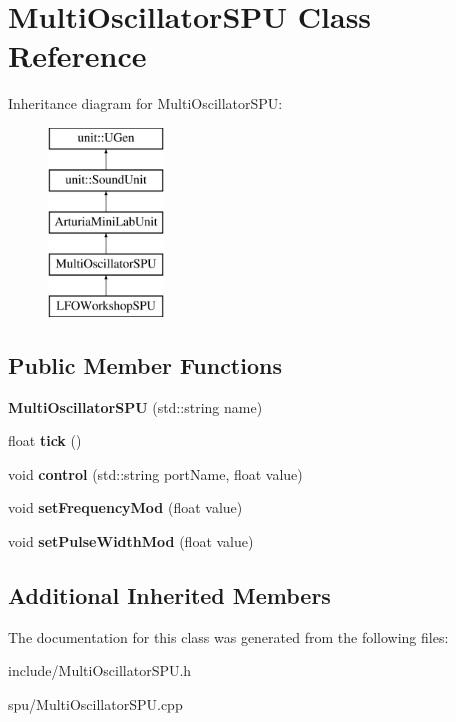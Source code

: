 \hypertarget{classMultiOscillatorSPU}{}\section{Multi\+Oscillator\+S\+PU Class Reference}
\label{classMultiOscillatorSPU}
Inheritance diagram for Multi\+Oscillator\+S\+PU\+:\begin{figure}[H]
\begin{center}
\leavevmode
\includegraphics[height=5.000000cm]{classMultiOscillatorSPU}
\end{center}
\end{figure}
\subsection*{Public Member Functions}
\begin{DoxyCompactItemize}
\item 
{\bfseries Multi\+Oscillator\+S\+PU} (std\+::string name)\hypertarget{classMultiOscillatorSPU_a3c7fc8e1067fb1b025551702344597a6}{}\label{classMultiOscillatorSPU_a3c7fc8e1067fb1b025551702344597a6}

\item 
float {\bfseries tick} ()\hypertarget{classMultiOscillatorSPU_ac5004f7b5bfa6025abee24b53abdd69f}{}\label{classMultiOscillatorSPU_ac5004f7b5bfa6025abee24b53abdd69f}

\item 
void {\bfseries control} (std\+::string port\+Name, float value)\hypertarget{classMultiOscillatorSPU_ab20794e0a79b779f35b36582cf4f65d0}{}\label{classMultiOscillatorSPU_ab20794e0a79b779f35b36582cf4f65d0}

\item 
void {\bfseries set\+Frequency\+Mod} (float value)\hypertarget{classMultiOscillatorSPU_a7040cf4388fe9bdaf624b707973241d0}{}\label{classMultiOscillatorSPU_a7040cf4388fe9bdaf624b707973241d0}

\item 
void {\bfseries set\+Pulse\+Width\+Mod} (float value)\hypertarget{classMultiOscillatorSPU_a42f7950c4fac230d97f43fa22587064e}{}\label{classMultiOscillatorSPU_a42f7950c4fac230d97f43fa22587064e}

\end{DoxyCompactItemize}
\subsection*{Additional Inherited Members}


The documentation for this class was generated from the following files\+:\begin{DoxyCompactItemize}
\item 
include/Multi\+Oscillator\+S\+P\+U.\+h\item 
spu/Multi\+Oscillator\+S\+P\+U.\+cpp\end{DoxyCompactItemize}

